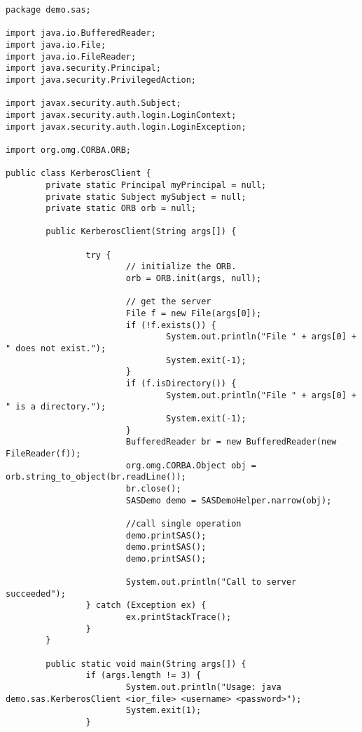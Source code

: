 \begin{scriptsize}
\begin{verbatim}
package demo.sas;

import java.io.BufferedReader;
import java.io.File;
import java.io.FileReader;
import java.security.Principal;
import java.security.PrivilegedAction;

import javax.security.auth.Subject;
import javax.security.auth.login.LoginContext;
import javax.security.auth.login.LoginException;

import org.omg.CORBA.ORB;

public class KerberosClient {
        private static Principal myPrincipal = null; 
        private static Subject mySubject = null;        
        private static ORB orb = null;
        
        public KerberosClient(String args[]) {

                try {
                        // initialize the ORB.
                        orb = ORB.init(args, null);

                        // get the server
                        File f = new File(args[0]);
                        if (!f.exists()) {
                                System.out.println("File " + args[0] + " does not exist.");
                                System.exit(-1);
                        }
                        if (f.isDirectory()) {
                                System.out.println("File " + args[0] + " is a directory.");
                                System.exit(-1);
                        }
                        BufferedReader br = new BufferedReader(new FileReader(f));
                        org.omg.CORBA.Object obj = orb.string_to_object(br.readLine());
                        br.close();
                        SASDemo demo = SASDemoHelper.narrow(obj);

                        //call single operation
                        demo.printSAS();
                        demo.printSAS();
                        demo.printSAS();

                        System.out.println("Call to server succeeded");
                } catch (Exception ex) {
                        ex.printStackTrace();
                }
        }
        
        public static void main(String args[]) {
                if (args.length != 3) {
                        System.out.println("Usage: java demo.sas.KerberosClient <ior_file> <username> <password>");
                        System.exit(1);
                }


\end{verbatim}
\end{scriptsize}
